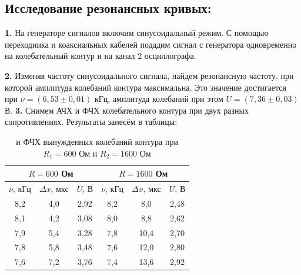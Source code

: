 \documentclass[a4paper, 12pt]{article}
\begin{document}
\subsection{Исследование резонансных кривых:}
\textbf{1.} На генераторе сигналов включим синусоидальный режим. С помощью переходника и коаксиальных кабелей подадим сигнал с генератора одновременно на колебательный контур и на канал 2 осциллографа.

\textbf{2.} Изменяя частоту синусоидального сигнала, найдем резонансную частоту, при которой амплитуда колебаний контура максимальна. Это значение достигается при $\nu = (6,53 \pm 0,01)$ кГц, амплитуда колебаний при этом $U = (7,36 \pm 0,03)$ В.
\textbf{3.} Снимем АЧХ и ФЧХ колебательного контура при двух разных сопротивлениях. Результаты занесём в таблицы:

	\begin{table}[H]
	\centering
	\caption{ и ФЧХ вынужденных колебаний контура при $R_1 = 600$ Ом и $R_2 = 1600$ Ом}
	\vspace{0.3cm}  
	\label{tab:4}
	\begin{tabular}{|ccc|ccc}
	\hline
	\multicolumn{3}{|c|}{$R = 600$ Ом}                                              & \multicolumn{3}{c|}{$R = 1600$ Ом}                                                                  \\ \hline
	\multicolumn{1}{|c|}{$\nu$, кГц} & \multicolumn{1}{c|}{$\Delta x$, мкс} & $U$, В & \multicolumn{1}{c|}{$\nu$, кГц} & \multicolumn{1}{c|}{$\Delta x$, мкс} & \multicolumn{1}{c|}{$U$, В} \\ \hline
	\multicolumn{1}{|c|}{8,2}       & \multicolumn{1}{c|}{4,0}             & 2,92   & \multicolumn{1}{c|}{8,2}       & \multicolumn{1}{c|}{8,0}             & \multicolumn{1}{c|}{2,48}   \\ \hline
	\multicolumn{1}{|c|}{8,1}       & \multicolumn{1}{c|}{4,2}             & 3,08   & \multicolumn{1}{c|}{8,0}       & \multicolumn{1}{c|}{8,8}             & \multicolumn{1}{c|}{2,62}   \\ \hline
	\multicolumn{1}{|c|}{7,9}       & \multicolumn{1}{c|}{5,4}             & 3,28   & \multicolumn{1}{c|}{7,8}       & \multicolumn{1}{c|}{10,4}            & \multicolumn{1}{c|}{2,70}   \\ \hline
	\multicolumn{1}{|c|}{7,8}       & \multicolumn{1}{c|}{5,8}             & 3,48   & \multicolumn{1}{c|}{7,6}       & \multicolumn{1}{c|}{12,0}            & \multicolumn{1}{c|}{2,80}   \\ \hline
	\multicolumn{1}{|c|}{7,6}       & \multicolumn{1}{c|}{7,2}             & 3,76   & \multicolumn{1}{c|}{7,4}       & \multicolumn{1}{c|}{13,6}            & \multicolumn{1}{c|}{2,92}   \\ \hline

\end{tabular}
\end{table}
\end{document}
